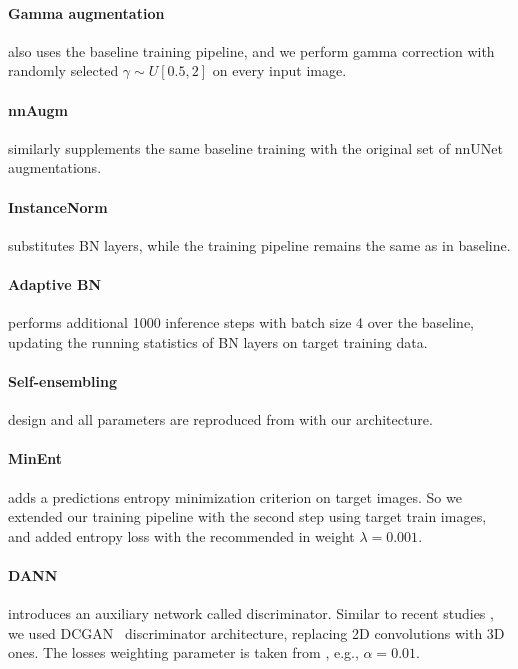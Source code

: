 \paragraph{Gamma augmentation} also uses the baseline training pipeline, and we perform gamma correction with randomly selected $\gamma \sim U[0.5, 2]$ on every input image.

\paragraph{nnAugm} similarly supplements the same baseline training with the original set of nnUNet \cite{nnunet} augmentations.

\paragraph{InstanceNorm} substitutes BN layers, while the training pipeline remains the same as in baseline.

\paragraph{Adaptive BN} performs additional 1000 inference steps with batch size 4 over the baseline, updating the running statistics of BN layers on target training data.

\paragraph{Self-ensembling} design and all parameters are reproduced from \cite{se_medim} with our architecture.

\paragraph{MinEnt} adds a predictions entropy minimization criterion on target images. So we extended our training pipeline with the second step using target train images, and added entropy loss with the recommended in \cite{entropy} weight $\lambda = 0.001$.

\paragraph{DANN} introduces an auxiliary network called discriminator. Similar to recent studies \cite{entropy}, we used DCGAN~\cite{dcgan} discriminator architecture, replacing 2D convolutions with 3D ones. The losses weighting parameter is taken from \cite{dann_medim}, e.g., $\alpha = 0.01$.

